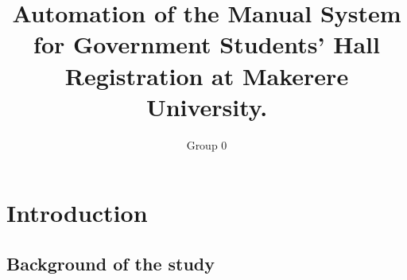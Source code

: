 \documentclass[12pt]{article}
\begin{document}
	\title{Automation of the Manual System for Government Students’ Hall Registration at Makerere University.}
	
	\author{Group 0}
	
	\maketitle
	\section{Introduction}
	\subsection{Background of the study}
	\paragraph{}
\end{document}
